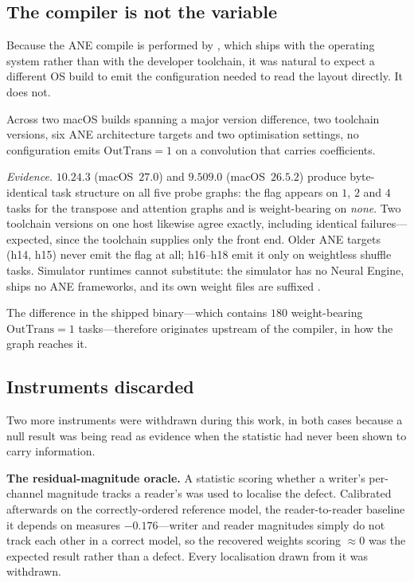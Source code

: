 \subsection{The compiler is not the variable}

Because the ANE compile is performed by , which ships with the operating
system rather than with the developer toolchain, it was natural to expect a different OS build to
emit the configuration needed to read the layout directly. It does not.

\begin{finding}\label{find:compiler}
Across two macOS builds spanning a major  version difference, two toolchain
versions, six ANE architecture targets and two optimisation settings, no configuration emits
$\mathrm{OutTrans}{=}1$ on a convolution that carries coefficients.
\end{finding}
\noindent\emph{Evidence.}  $10.24.3$ (macOS~$27.0$) and $9.509.0$
(macOS~$26.5.2$) produce byte-identical task structure on all five probe graphs: the flag appears on
$1$, $2$ and $4$ tasks for the transpose and attention graphs and is weight-bearing on \emph{none}.
Two toolchain versions on one host likewise agree exactly, including identical failures---expected,
since the toolchain supplies only the front end. Older ANE targets (h14, h15) never emit the flag at
all; h16--h18 emit it only on weightless shuffle tasks. Simulator runtimes cannot substitute: the
simulator has no Neural Engine, ships no ANE frameworks, and its own weight files are suffixed
.

The difference in the shipped binary---which contains $180$ weight-bearing $\mathrm{OutTrans}{=}1$
tasks---therefore originates upstream of the compiler, in how the graph reaches it.

\subsection{Instruments discarded}\label{sec:retract-basis}

Two more instruments were withdrawn during this work, in both cases because a null result was being
read as evidence when the statistic had never been shown to carry information.

\textbf{The residual-magnitude oracle.} A statistic scoring whether a writer's per-channel magnitude
tracks a reader's was used to localise the defect. Calibrated afterwards on the correctly-ordered
reference model, the reader-to-reader baseline it depends on measures $-0.176$---writer and reader
magnitudes simply do not track each other in a correct model, so the recovered weights scoring $\approx 0$
was the expected result rather than a defect. Every localisation drawn from it was withdrawn.

